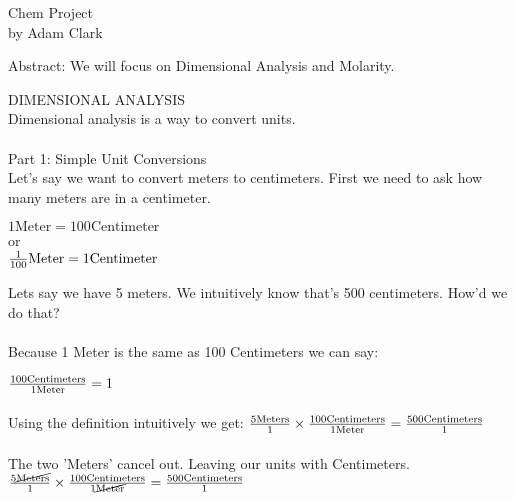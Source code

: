 \documentclass[14pt]{extarticle}
\begin{document}
    \center
    \LARGE Chem Project \\ 
    \normalsize
    by Adam Clark
    \vspace{\fill}
    
    \flushleft
    Abstract: We will focus on Dimensional Analysis and Molarity.
    \pagebreak
    
    \flushleft
    \large DIMENSIONAL ANALYSIS \\
    \normalsize
    Dimensional analysis is a way to convert units. 
    \\~~~\\
    Part 1: Simple Unit Conversions\\
    Let's say we want to convert meters to centimeters. First we need to ask how many meters are in a centimeter. 
    
    \center
    $ 1 \text{Meter} = 100 \text{Centimeter} $
    \\ or \\
    $ {1 \over 100} \text{Meter} = 1 \text{Centimeter} $
    \flushleft
    
    Lets say we have 5 meters. We intuitively know that's 500 centimeters. How'd we do that?
    \\~~~\\
    Because 1 Meter is the same as 100 Centimeters we can say:

    \center \large
    ${100 \text{Centimeters} \over 1 \text {Meter}} = 1$
    \\~\\
    \flushleft \normalsize
    Using the definition intuitively we get:
    \center \large
    ${5 \text{Meters} \over 1} \times {100 \text{Centimeters} \over 1 \text {Meter}} = {500 \text{Centimeters} \over 1}$
    \\~\\
    \flushleft \normalsize
    The two 'Meters' cancel out. Leaving our units with Centimeters. 
    \center \large
    ${5 \cancel{\text{Meters}} \over 1} \times {100 \text{Centimeters} \over 1 \cancel{\text {Meter}}} = {500 \text{Centimeters} \over 1}$
    
    
    
    
    
\end{document}
